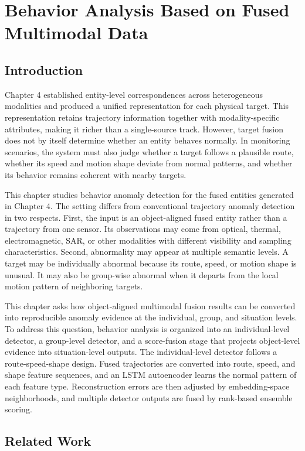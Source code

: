 \chapter{Behavior Analysis Based on Fused Multimodal Data}

\section{Introduction}
Chapter 4 established entity-level correspondences across heterogeneous modalities and produced a unified representation for each physical target. This representation retains trajectory information together with modality-specific attributes, making it richer than a single-source track. However, target fusion does not by itself determine whether an entity behaves normally. In monitoring scenarios, the system must also judge whether a target follows a plausible route, whether its speed and motion shape deviate from normal patterns, and whether its behavior remains coherent with nearby targets.

This chapter studies behavior anomaly detection for the fused entities generated in Chapter 4. The setting differs from conventional trajectory anomaly detection in two respects. First, the input is an object-aligned fused entity rather than a trajectory from one sensor. Its observations may come from optical, thermal, electromagnetic, SAR, or other modalities with different visibility and sampling characteristics. Second, abnormality may appear at multiple semantic levels. A target may be individually abnormal because its route, speed, or motion shape is unusual. It may also be group-wise abnormal when it departs from the local motion pattern of neighboring targets.

This chapter asks how object-aligned multimodal fusion results can be converted into reproducible anomaly evidence at the individual, group, and situation levels. To address this question, behavior analysis is organized into an individual-level detector, a group-level detector, and a score-fusion stage that projects object-level evidence into situation-level outputs. The individual-level detector follows a route-speed-shape design. Fused trajectories are converted into route, speed, and shape feature sequences, and an LSTM autoencoder learns the normal pattern of each feature type. Reconstruction errors are then adjusted by embedding-space neighborhoods, and multiple detector outputs are fused by rank-based ensemble scoring.

\section{Related Work}

